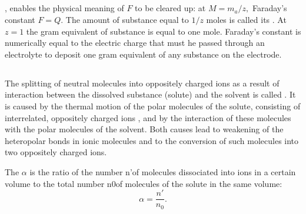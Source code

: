 \subsection{}\label{22.1.4} ,
enables the physical meaning of $F$ to be cleared up: at $M = m_{a}/z,$ Faraday's constant $F = Q$. The amount of substance equal to $1/z$ moles is called its . At $z = 1$ the gram equivalent of substance is equal to one mole. Faraday's constant is numerically equal to the electric charge that must he passed through an electrolyte to deposit one gram equivalent of any substance on the electrode.

\subsection{}\label{22.1.5} The splitting of neutral molecules into oppositely charged ions as a result of interaction between the dissolved substance (solute) and the solvent is called . It is caused by the thermal motion of the polar molecules  of the solute, consisting of interrelated, oppositely charged ions , and by the interaction of these molecules with the polar molecules of the solvent. Both causes lead to weakening of the heteropolar bonds in ionic molecules  and to the conversion of such molecules into two oppositely charged ions. 

The  $\alpha$ is the ratio of the number n'of molecules dissociated into ions in a certain volume to the total number n0of molecules of the solute in the same volume: 
\begin{equation*}%
\alpha = \frac{n'}{n_{0}}.
\end{equation*}

